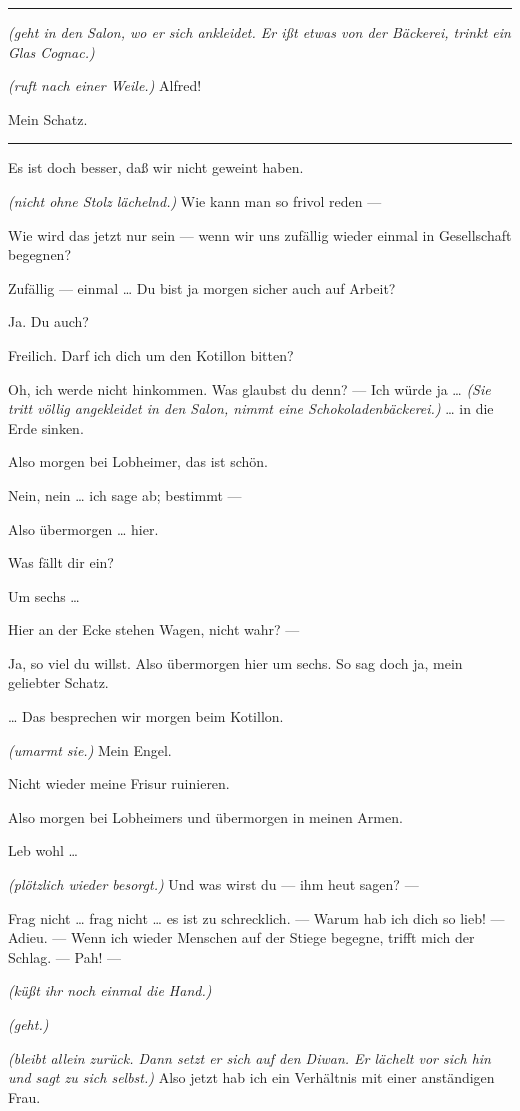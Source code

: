 \documentclass[
	final,
	a4paper,
	ngerman,
	mpinclude = true, %
	twoside = true,
	open = right,
	cleardoublepage = plain,
	DIV = 13,
	BCOR = 1cm,
	titlepage = firstiscover,
	]{scrbook}
\newcommand{\direction}[1]{\textit{(#1)}}
\newenvironment{deletion}{%
		\vspace{0.25\baselineskip}
		\hrule
		\vspace{0.25\baselineskip}
		\color{darkgray}
	}{
		\color{black}
		\vspace{0.25\baselineskip}
		\hrule 
		\vspace{0.25\baselineskip}
	}
\newcommand{\thecharacter}[1]{\textup{\textsc{#1}}\xspace}
\newcommand{\theherr}{\thecharacter{Benjamin}}
\newcommand{\thefrau}{\thecharacter{Emma}}
\newcommand{\character}[1]{\item[#1:]}
\newcommand{\herr}{\character{\theherr}}
\newcommand{\frau}{\character{\thefrau}}
\begin{document}
\begin{play}
\begin{deletion}
	\herr
	\direction{geht in den Salon, wo er sich ankleidet. Er ißt etwas von der Bäckerei, trinkt ein Glas Cognac.}

	\frau
	\direction{ruft nach einer Weile.} Alfred!

	\herr
	Mein Schatz.

	\end{deletion}
	\frau
	Es ist doch besser, daß wir nicht geweint haben.

	\herr
	\direction{nicht ohne Stolz lächelnd.} Wie kann man so frivol reden ---

	\frau
	Wie wird das jetzt nur sein --- wenn wir uns zufällig wieder einmal in Gesellschaft begegnen?

	\herr
	Zufällig --- einmal \ldots{} Du bist ja morgen sicher auch auf Arbeit?

	\frau
	Ja. Du auch?

	\herr
	Freilich. Darf ich dich um den Kotillon bitten?

	\frau
	Oh, ich werde nicht hinkommen. Was glaubst du denn? --- Ich würde ja \ldots{} \direction{Sie tritt völlig angekleidet in den Salon, nimmt eine Schokoladenbäckerei.} \ldots{} in die Erde sinken.

	\herr
	Also morgen bei Lobheimer, das ist schön.

	\frau
	Nein, nein \ldots{} ich sage ab; bestimmt ---

	\herr
	Also übermorgen \ldots{} hier.

	\frau
	Was fällt dir ein?

	\herr
	Um sechs \ldots{}

	\frau
	Hier an der Ecke stehen Wagen, nicht wahr? ---

	\herr
	Ja, so viel du willst. Also übermorgen hier um sechs. So sag doch ja, mein geliebter Schatz.

	\frau
	\ldots{} Das besprechen wir morgen beim Kotillon.

	\herr
	\direction{umarmt sie.} Mein Engel.

	\frau
	Nicht wieder meine Frisur ruinieren.

	\herr
	Also morgen bei Lobheimers und übermorgen in meinen Armen.

	\frau
	Leb wohl \ldots{}

	\herr
	\direction{plötzlich wieder besorgt.} Und was wirst du --- ihm heut sagen? ---

	\frau
	Frag nicht \ldots{} frag nicht \ldots{} es ist zu schrecklich. --- Warum hab ich dich so lieb! --- Adieu. --- Wenn ich wieder Menschen auf der Stiege begegne, trifft mich der Schlag. --- Pah! ---

	\herr
	\direction{küßt ihr noch einmal die Hand.}

	\frau
	\direction{geht.}

	\herr
	\direction{bleibt allein zurück. Dann setzt er sich auf den Diwan. Er lächelt vor sich hin und sagt zu sich selbst.} Also jetzt hab ich ein Verhältnis mit einer anständigen Frau.

\end{play}
\end{document}
